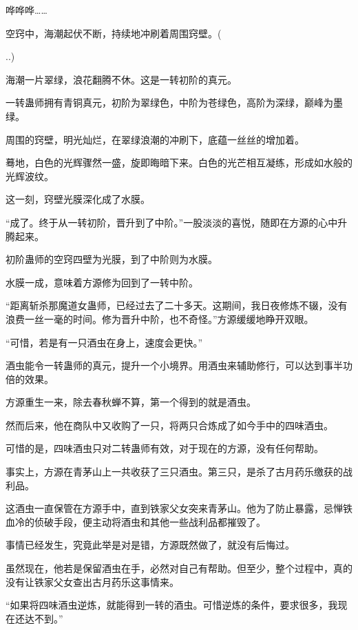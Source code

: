 
\begin{this_body}

哗哗哗……

空窍中，海潮起伏不断，持续地冲刷着周围窍壁。(

..)

海潮一片翠绿，浪花翻腾不休。这是一转初阶的真元。

一转蛊师拥有青铜真元，初阶为翠绿色，中阶为苍绿色，高阶为深绿，巅峰为墨绿。

周围的窍壁，明光灿烂，在翠绿浪潮的冲刷下，底蕴一丝丝的增加着。

蓦地，白色的光辉骤然一盛，旋即晦暗下来。白色的光芒相互凝练，形成如水般的光辉波纹。

这一刻，窍壁光膜深化成了水膜。

“成了。终于从一转初阶，晋升到了中阶。”一股淡淡的喜悦，随即在方源的心中升腾起来。

初阶蛊师的空窍四壁为光膜，到了中阶则为水膜。

水膜一成，意味着方源修为回到了一转中阶。

“距离斩杀那魔道女蛊师，已经过去了二十多天。这期间，我日夜修炼不辍，没有浪费一丝一毫的时间。修为晋升中阶，也不奇怪。”方源缓缓地睁开双眼。

“可惜，若是有一只酒虫在身上，速度会更快。”

酒虫能令一转蛊师的真元，提升一个小境界。用酒虫来辅助修行，可以达到事半功倍的效果。

方源重生一来，除去春秋蝉不算，第一个得到的就是酒虫。

然而后来，他在商队中又收购了一只，将两只合炼成了如今手中的四味酒虫。

可惜的是，四味酒虫只对二转蛊师有效，对于现在的方源，没有任何帮助。

事实上，方源在青茅山上一共收获了三只酒虫。第三只，是杀了古月药乐缴获的战利品。

这酒虫一直保管在方源手中，直到铁家父女突来青茅山。他为了防止暴露，忌惮铁血冷的侦破手段，便主动将酒虫和其他一些战利品都摧毁了。

事情已经发生，究竟此举是对是错，方源既然做了，就没有后悔过。

虽然现在，他若是保留酒虫在手，必然对自己有帮助。但至少，整个过程中，真的没有让铁家父女查出古月药乐这事情来。

“如果将四味酒虫逆炼，就能得到一转的酒虫。可惜逆炼的条件，要求很多，我现在还达不到。”


\end{this_body}
